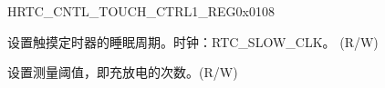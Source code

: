 \begin{register}{H}{RTC\_CNTL\_TOUCH\_CTRL1\_REG}{0x{}0108}\label{regdesc:RTCCNTLRTCTOUCHCTRL1REG}
%
%
\regnewline%
\begin{regdesc}\begin{reglist}
\label{fielddesc:RTCCNTLTOUCHSLEEPCYCLES}\item [RTC\_CNTL\_TOUCH\_SLEEP\_CYCLES] 设置触摸定时器的睡眠周期。时钟：RTC\_SLOW\_CLK。 (R/W)
\label{fielddesc:RTCCNTLTOUCHMEASNUM}\item [RTC\_CNTL\_TOUCH\_MEAS\_NUM] 设置测量阈值，即充放电的次数。(R/W) 
\end{reglist}\end{regdesc}
\end{register}


